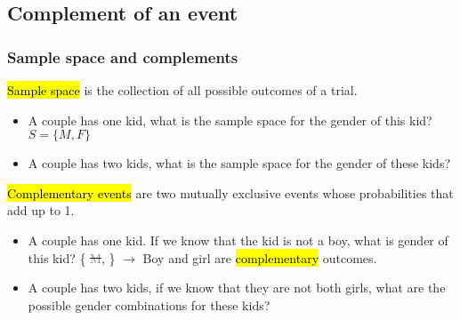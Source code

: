 \documentclass[slidestop,compress,mathserif]{beamer}
\newcommand{\soln}[1]{\textit{#1}}
\begin{document}




\subsection{Complement of an event}


\begin{frame}
\frametitle{Sample space and complements}

\hl{Sample space} is the collection of all possible outcomes of a trial.

\begin{itemize}
\item A couple has one kid, what is the sample space for the gender of this kid? $S = \{ M, F \}$
\item A couple has two kids, what is the sample space for the gender of these kids? \soln{}
\end{itemize}

\pause

\hl{Complementary events} are two mutually exclusive events whose probabilities that add up to 1.

\begin{itemize}
\item A couple has one kid. If we know that the kid is not a boy, what is gender of this kid?
\{ \sout{\textcolor{gray}{M}},  \} $\rightarrow$ Boy and girl are \hl{complementary} outcomes.
\item A couple has two kids, if we know that they are not both girls, what are the possible gender combinations for these kids?
\soln{\pause{\{ \orange{MM}, \sout{\textcolor{gray}{FF}}, \orange{FM}, \orange{MF} \} }}
\end{itemize}

\end{frame}
\end{document}
